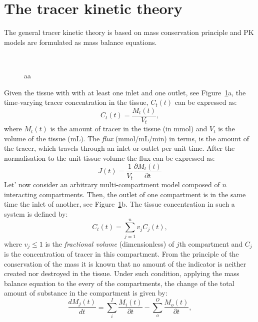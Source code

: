 \section{The tracer kinetic theory} 
The general tracer kinetic theory is based on mass conservation principle and PK models are formulated as mass balance equations. 
\begin{figure}[H]
\captionsetup[subfloat]{captionskip=0.5cm}
	\centering
	\\	
\vspace{0.5cm}
\caption[ddd]{aa}
\label{fig:model}
\end{figure}
\noindent Given the tissue with with at least one inlet and one outlet, see Figure~\ref{fig:model}a, the time-varying tracer concentration in the tissue, $C_t(t)$ can be expressed as:
\begin{equation}
C_t(t) = \frac{M_t(t)}{V_t},
\label{eq:pk1}
\end{equation}
where $M_t(t)$ is the amount of tracer in the tissue (in mmol) and $V_t$ is the volume of the tissue (mL). The \textit{flux} (mmol/mL/min) in terms, is the amount of the tracer, which travels through an inlet or outlet per unit time. After the normalisation to the unit tissue volume the flux can be expressed as:
\begin{equation}
J(t) = \frac{1}{V_t}\frac{\partial M_t(t)}{\partial t}
\label{eq:pk2}
\end{equation} 
Let' now consider an arbitrary multi-compartment model composed of $n$ interacting compartments. Then, the outlet of one compartment is in the same time the inlet of another, see Figure~\ref{fig:model}b. The tissue concentration in such a system is defined by:   
\begin{equation}
C_t(t) = \sum_{j=1}^{n}v_jC_j(t),
\label{eq:pk3}
\end{equation}
where $v_j\leq1$ is the \textit{fractional volume} (dimensionless) of $j$th compartment and $C_j$ is the concentration of tracer in this compartment. 
From the principle of the conservation of the mass it is known that no amount of the indicator is neither created nor destroyed in the tissue. Under such condition, applying the mass balance equation to the every of the compartments, the change of the total amount of substance in the compartment is given by:
\begin{equation}
\frac{dM_j(t)}{dt} = \sum_{i}^{I}\frac{M_i(t)}{\partial t}-\sum_{o}^{O}\frac{M_o(t)}{\partial t} ,
\label{eq:pk4}
\end{equation}

